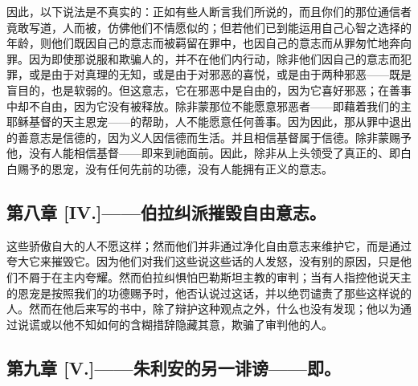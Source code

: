 因此，以下说法是不真实的：正如有些人断言我们所说的，而且你们的那位通信者竟敢写道，人而被，仿佛他们不情愿似的；但若他们已到能运用自己心智之选择的年龄，则他们既因自己的意志而被羁留在罪中，也因自己的意志而从罪匆忙地奔向罪。因为即使那说服和欺骗人的，并不在他们内行动，除非他们因自己的意志而犯罪，或是由于对真理的无知，或是由于对邪恶的喜悦，或是由于两种邪恶——既是盲目的，也是软弱的。但这意志，它在邪恶中是自由的，因为它喜好邪恶；在善事中却不自由，因为它没有被释放。除非蒙那位不能愿意邪恶者——即藉着我们的主耶稣基督的天主恩宠——的帮助，人不能愿意任何善事。因为因此，那从罪中退出的善意志是信德的，因为义人因信德而生活。并且相信基督属于信德。除非蒙赐予他，没有人能相信基督——即来到祂面前。因此，除非从上头领受了真正的、即白白赐予的恩宠，没有任何先前的功德，没有人能拥有正义的意志。\par


\subsection{第八章 [IV.]——伯拉纠派摧毁自由意志。}

这些骄傲自大的人不愿这样；然而他们并非通过净化自由意志来维护它，而是通过夸大它来摧毁它。因为他们对我们这些说这些话的人发怒，没有别的原因，只是他们不屑于在主内夸耀。然而伯拉纠惧怕巴勒斯坦主教的审判；当有人指控他说天主的恩宠是按照我们的功德赐予时，他否认说过这话，并以绝罚谴责了那些这样说的人。然而在他后来写的书中，除了辩护这种观点之外，什么也没有发现；他以为通过说谎或以他不知如何的含糊措辞隐藏其意，欺骗了审判他的人。\par


\subsection{第九章 [V.]——朱利安的另一诽谤——即。}

